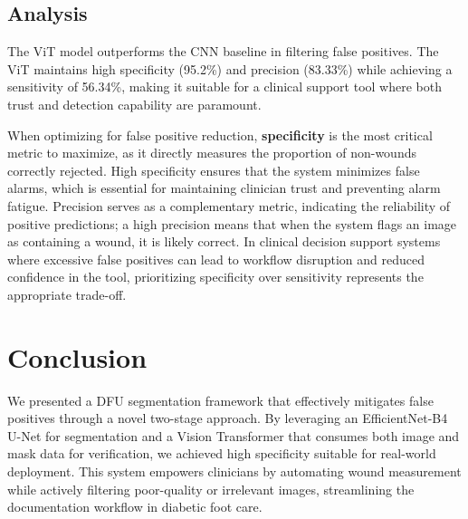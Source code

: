 \documentclass{article}
\begin{document}
   \subsection{Analysis}
   The ViT model outperforms the CNN baseline in filtering false positives. The ViT maintains high specificity (95.2\%) and precision (83.33\%) while achieving a sensitivity of 56.34\%, making it suitable for a clinical support tool where both trust and detection capability are paramount.

   When optimizing for false positive reduction, \textbf{specificity} is the most critical metric to maximize, as it directly measures the proportion of non-wounds correctly rejected. High specificity ensures that the system minimizes false alarms, which is essential for maintaining clinician trust and preventing alarm fatigue. Precision serves as a complementary metric, indicating the reliability of positive predictions; a high precision means that when the system flags an image as containing a wound, it is likely correct. In clinical decision support systems where excessive false positives can lead to workflow disruption and reduced confidence in the tool, prioritizing specificity over sensitivity represents the appropriate trade-off.


\section{Conclusion}
We presented a DFU segmentation framework that effectively mitigates false positives through a novel two-stage approach. By leveraging an EfficientNet-B4 U-Net \cite{tan2019efficientnet,ronneberger2015unet} for segmentation and a Vision Transformer \cite{dosovitskiy2020image} that consumes both image and mask data for verification, we achieved high specificity suitable for real-world deployment. This system empowers clinicians by automating wound measurement while actively filtering poor-quality or irrelevant images, streamlining the documentation workflow in diabetic foot care.
\end{document}

